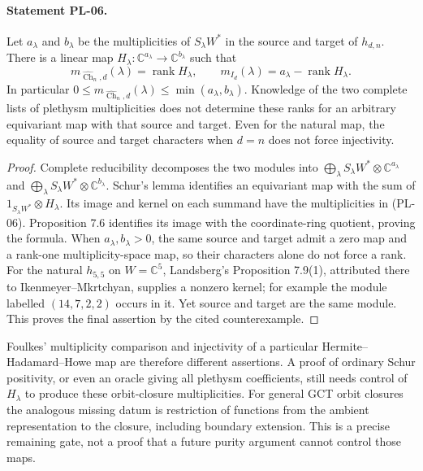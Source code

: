 \paragraph{Statement PL-06.}
Let $a_\lambda$ and $b_\lambda$ be the multiplicities of $S_\lambda W^*$
in the source and target of $h_{d,n}$. There is a linear map
$H_\lambda:\mathbb C^{a_\lambda}\to\mathbb C^{b_\lambda}$ such that
\[
 m_{\widehat{\operatorname{Ch}}_n,d}(\lambda)=\operatorname{rank}H_\lambda,
 \qquad
 m_{I_d}(\lambda)=a_\lambda-\operatorname{rank}H_\lambda.
 \tag{PL-06}
\]
In particular $0\leq m_{\widehat{\operatorname{Ch}}_n,d}(\lambda)
\leq\min(a_\lambda,b_\lambda)$. Knowledge of the two complete lists of
plethysm multiplicities does not determine these ranks for an arbitrary
equivariant map with that source and target. Even for the natural map,
the equality of source and target characters when $d=n$ does not force
injectivity.

\begin{proof}
Complete reducibility decomposes the two modules into
$\bigoplus_\lambda S_\lambda W^*\otimes\mathbb C^{a_\lambda}$ and
$\bigoplus_\lambda S_\lambda W^*\otimes\mathbb C^{b_\lambda}$.
Schur's lemma identifies an equivariant map with the sum of
$1_{S_\lambda W^*}\otimes H_\lambda$. Its image and kernel on each
summand have the multiplicities in (PL-06). Proposition 7.6 identifies its
image with the coordinate-ring quotient, proving the formula.
When $a_\lambda,b_\lambda>0$, the same source and target admit a zero map
and a rank-one multiplicity-space map, so their characters alone do not
force a rank. For the natural $h_{5,5}$ on $W=\mathbb C^5$, Landsberg's Proposition 7.9(1),
attributed there to Ikenmeyer--Mkrtchyan, supplies a nonzero kernel; for
example the module labelled $(14,7,2,2)$ occurs in it. Yet source and
target are the same module. This proves the final assertion by the cited
counterexample.
\end{proof}

Foulkes' multiplicity comparison and injectivity of a particular
Hermite--Hadamard--Howe map are therefore different assertions. A proof of
ordinary Schur positivity, or even an oracle giving all plethysm coefficients,
still needs control of $H_\lambda$ to produce these orbit-closure multiplicities.
For general GCT orbit closures the analogous missing datum is restriction
of functions from the ambient representation to the closure, including
boundary extension. This is a precise remaining gate, not a proof that a
future purity argument cannot control those maps.

